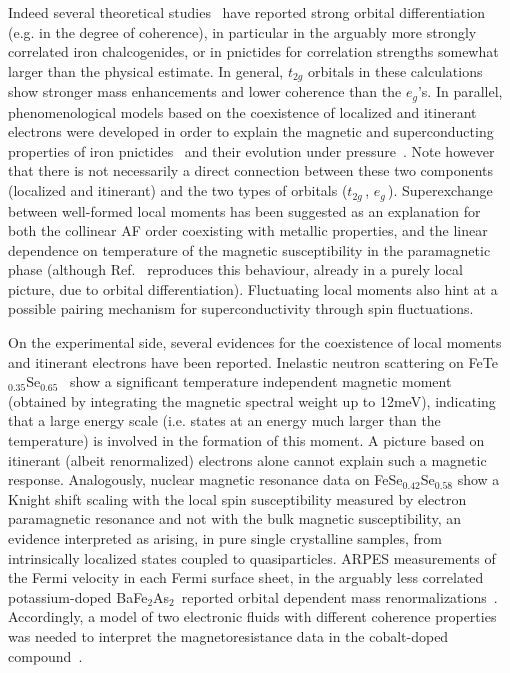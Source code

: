 \documentclass[]{ar2e-changed}%
\def\ttg{$t_{2g}\,$}
\def\eg{$e_{g}\,$}
\def\BFA{BaFe$_2$As$_2$}
\begin{document}
Indeed several theoretical studies~\cite{Aichhorn_FeSe,Laad_SusceptibilityPnictides_OSM,Craco_FeSe,Yin_kinetic_frustration_allFeSC,YuSi_LDA-SlaveSpins_LaFeAsO, yu_multiorbital_Mott_prb_2011,Ferber_LiFeAs_LDA_DMFT}
have reported strong orbital differentiation (e.g. in the degree of
coherence), in particular in the arguably more strongly correlated iron
chalcogenides, or in pnictides for correlation strengths somewhat
larger than the physical estimate\cite{Shorikov_LaFeAsO_OSMT}. In
general, $t_{2g}$ orbitals in these calculations show stronger mass
enhancements and lower coherence than the $e_g$'s.
%
In parallel, phenomenological models based on the coexistence of
localized and itinerant electrons were developed in order to explain the
magnetic and superconducting properties of iron pnictides~\cite{Kou_OSMT_pnictides} 
and their evolution under pressure~\cite{Hackl_Vojta_OSMT_pnictides}. 
%
Note however that there is not necessarily a direct connection between these 
two components (localized and itinerant) and the two types of orbitals (\ttg, \eg).  
%
Superexchange between well-formed local moments has been suggested as an explanation for both the collinear AF order
coexisting with metallic properties, and the linear dependence on temperature of the magnetic susceptibility in the paramagnetic phase
(although Ref.~\cite{Skornyakov_linear_susc_LaFeAsO} reproduces this behaviour, already in a purely local picture, 
due to orbital differentiation). 
Fluctuating local moments also hint at a possible pairing mechanism for superconductivity through spin fluctuations.

On the experimental side, several evidences for the coexistence of local moments and itinerant electrons have been reported. 
Inelastic neutron scattering on FeTe$_{0.35}$Se$_{0.65}$~\cite{Xu_neutrons_FeTeSe_local-itinerant} show a significant temperature independent magnetic moment (obtained by integrating the magnetic spectral weight up to 12meV), indicating that a large energy scale (i.e. states at an energy much larger than the temperature) is involved in the formation of this moment. A picture based on itinerant (albeit renormalized) electrons alone cannot explain such a magnetic response.
%
Analogously, nuclear magnetic resonance  data on FeSe$_{0.42}$Se$_{0.58}$ \cite{Arcon_NMR_EPR_FeSeTe_local-itinerant} show a Knight shift scaling with the local spin susceptibility measured by electron paramagnetic resonance and not with the bulk magnetic susceptibility, an evidence  interpreted as arising, in pure single crystalline samples, from intrinsically localized states coupled to quasiparticles.
%
ARPES measurements of the Fermi velocity in each Fermi surface sheet, in the arguably less correlated potassium-doped \BFA\, reported orbital dependent mass renormalizations~\cite{Ding_Arpes_BaK}. Accordingly, a model of two electronic fluids with different coherence properties was needed to interpret the magnetoresistance data in the cobalt-doped compound~\cite{Yuan_magnetoresistance_122_local-itinerant}.
\end{document}
